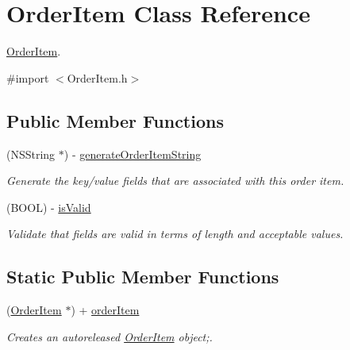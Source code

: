 \hypertarget{interface_order_item}{
\section{OrderItem Class Reference}
\label{interface_order_item}
}


\hyperlink{interface_order_item}{OrderItem}.  




{\ttfamily \#import $<$OrderItem.h$>$}

\subsection*{Public Member Functions}
\begin{DoxyCompactItemize}
\item 
(NSString $\ast$) -\/ \hyperlink{interface_order_item_a37014a281fd7de5cb47f7086bda85496}{generateOrderItemString}
\begin{DoxyCompactList}\small\item\em Generate the key/value fields that are associated with this order item. \item\end{DoxyCompactList}\item 
(BOOL) -\/ \hyperlink{interface_order_item_a1b1da612579aad28dbd3422a06ddde3c}{isValid}
\begin{DoxyCompactList}\small\item\em Validate that fields are valid in terms of length and acceptable values. \item\end{DoxyCompactList}\end{DoxyCompactItemize}
\subsection*{Static Public Member Functions}
\begin{DoxyCompactItemize}
\item 
(\hyperlink{interface_order_item}{OrderItem} $\ast$) + \hyperlink{interface_order_item_a142112358ad38990b26733ad757ddfe2}{orderItem}
\begin{DoxyCompactList}\small\item\em Creates an autoreleased \hyperlink{interface_order_item}{OrderItem} object;. \item\end{DoxyCompactList}\end{DoxyCompactItemize}
